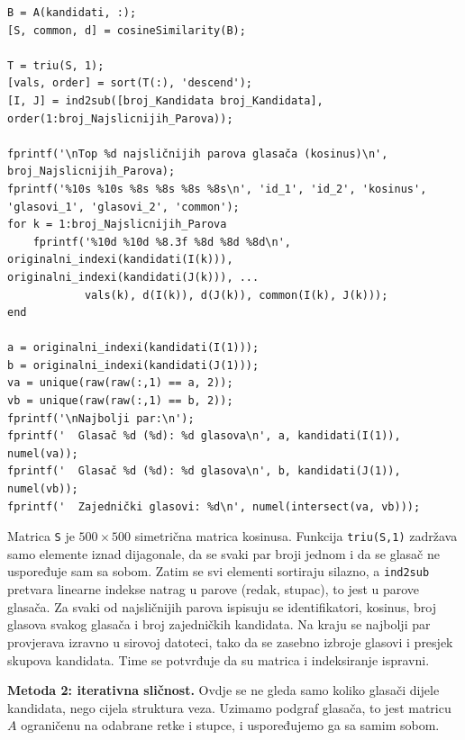 \documentclass[12pt, letterpaper]{article}
\numberwithin{figure}{section}
\begin{document}
\begin{lstlisting}[style=octave, caption={Kosinusna sličnost glasača}, label={lst:wiki_cos}]
B = A(kandidati, :);              
[S, common, d] = cosineSimilarity(B);

T = triu(S, 1);
[vals, order] = sort(T(:), 'descend');
[I, J] = ind2sub([broj_Kandidata broj_Kandidata], order(1:broj_Najslicnijih_Parova));

fprintf('\nTop %d najsličnijih parova glasača (kosinus)\n', broj_Najslicnijih_Parova);
fprintf('%10s %10s %8s %8s %8s %8s\n', 'id_1', 'id_2', 'kosinus', 'glasovi_1', 'glasovi_2', 'common');
for k = 1:broj_Najslicnijih_Parova
    fprintf('%10d %10d %8.3f %8d %8d %8d\n', originalni_indexi(kandidati(I(k))), originalni_indexi(kandidati(J(k))), ...
            vals(k), d(I(k)), d(J(k)), common(I(k), J(k)));
end

a = originalni_indexi(kandidati(I(1)));
b = originalni_indexi(kandidati(J(1)));
va = unique(raw(raw(:,1) == a, 2));
vb = unique(raw(raw(:,1) == b, 2));
fprintf('\nNajbolji par:\n');
fprintf('  Glasač %d (%d): %d glasova\n', a, kandidati(I(1)), numel(va));
fprintf('  Glasač %d (%d): %d glasova\n', b, kandidati(J(1)), numel(vb));
fprintf('  Zajednički glasovi: %d\n', numel(intersect(va, vb)));
\end{lstlisting}
Matrica \texttt{S} je $500\times 500$ simetrična matrica kosinusa. Funkcija \texttt{triu(S,1)} zadržava samo elemente iznad dijagonale, da se svaki par broji jednom i da se glasač ne uspoređuje sam sa sobom. Zatim se svi elementi sortiraju silazno, a \texttt{ind2sub} pretvara linearne indekse natrag u parove (redak, stupac), to jest u parove glasača. Za svaki od najsličnijih parova ispisuju se identifikatori, kosinus, broj glasova svakog glasača i broj zajedničkih kandidata. Na kraju se najbolji par provjerava izravno u sirovoj datoteci, tako da se zasebno izbroje glasovi i presjek skupova kandidata. Time se potvrđuje da su matrica i indeksiranje ispravni.

\textbf{Metoda 2: iterativna sličnost.} Ovdje se ne gleda samo koliko glasači dijele kandidata, nego cijela struktura veza. Uzimamo podgraf glasača, to jest matricu $A$ ograničenu na odabrane retke i stupce, i uspoređujemo ga sa samim sobom.
\end{document}
